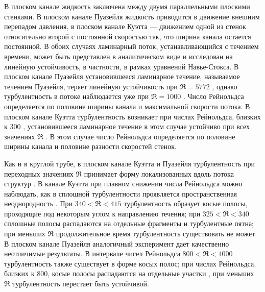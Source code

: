 В плоском канале жидкость заключена между двумя параллельными плоскими стенками. В плоском канале Пуазейля жидкость приводится в движение внешним перепадом давления, в плоском канале Куэтта --- движением одной из стенок относительно второй с постоянной скоростью так, что ширина канала остается постоянной. В обоих случаях ламинарный поток, устанавливающийся с течением времени, может быть представлен в аналитическом виде и исследован на линейную устойчивость, в частности, в рамках уравнений Навье-Стокса. В плоском канале Пуазейля установившееся ламинарное течение, называемое течением Пуазейля, теряет линейную устойчивость при $\Re = 5772$ \cite{Orszag1971}, однако турбулентность в потоке наблюдается уже при $\Re = 1000$ \cite{Orszag1980}. Число Рейнольдса определяется по половине ширины канала и максимальной скорости потока. В плоском канале Куэтта турбулентность возникает при числах Рейнольдса, близких к $300$ \cite{Bottin1998}, установившееся ламинарное течение в этом случае устойчиво при всех значениях $\Re$ \cite{Romanov1973}. В этом случае число Рейнольдса определяется по половине ширины канала и половине разности скоростей стенок. 

Как и в круглой трубе, в плоском канале Куэтта и Пуазейля турбулентность при переходных значениях $\Re$ принимает форму локализованных вдоль потока структур \cite{Prigent2002, Barkley2005}. В канале Куэтта при плавном снижении числа Рейнольдса можно наблюдать, как в сплошной турбулентности проявляется пространственная неоднородность \cite{Duguet2010Couette}. При $340 < \Re < 415$ турбулентность образует косые полосы, проходящие под некоторым углом к направлению течения; при $325 < \Re < 340$ сплошные полосы распадаются на отдельные фрагменты и турбулентные пятна; при меньших $\Re$ продолжительное время турбулентность существовать не может. В плоском канале Пуазейля аналогичный эксперимент дает качественно неотличимые результаты. В интервале чисел Рейнольдса $800 < \Re < 1000$ турбулентность также существует в форме косых полос; при числах Рейнольдса, близких к 800, косые полосы распадаются на отдельные участки \cite{Tuckerman2014, Lernoult2014, Sano2015}, при меньших $\Re$ турбулентность перестает быть устойчивой. 

